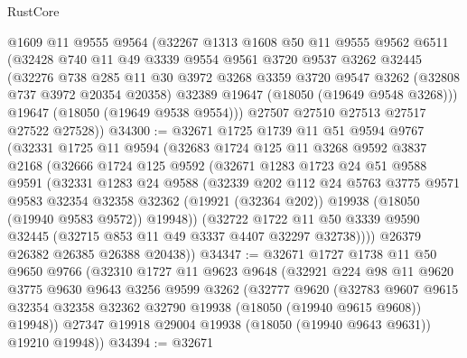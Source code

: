\begin{lexlean}{RustCore}
\begin{coremodule}
      @1609
      @11
      @9555
      @9564
      (@32267
        @1313
        @1608
        @50
        @11
        @9555
        @9562
        @6511
        (@32428
          @740
          @11
          @49
          @3339
          @9554
          @9561
          @3720
          @9537
          @3262
          @32445
          (@32276
            @738
            @285
            @11
            @30
            @3972
            @3268
            @3359
            @3720
            @9547
            @3262
            (@32808 @737 @3972 @20354 @20358)
            @32389
            @19647
            (@18050 (@19649 @9548 @3268)))
          @19647
          (@18050 (@19649 @9538 @9554)))
        @27507
        @27510
        @27513
        @27517
        @27522
        @27528))
@34300 := @32671
    @1725
    @1739
    @11
    @51
    @9594
    @9767
    (@32331
      @1725
      @11
      @9594
      (@32683
        @1724
        @125
        @11
        @3268
        @9592
        @3837
        @2168
        (@32666
          @1724
          @125
          @9592
          (@32671
            @1283
            @1723
            @24
            @51
            @9588
            @9591
            (@32331
              @1283
              @24
              @9588
              (@32339
                @202
                @112
                @24
                @5763
                @3775
                @9571
                @9583
                @32354
                @32358
                @32362
                (@19921 (@32364 @202))
                @19938
                (@18050 (@19940 @9583 @9572))
                @19948))
            (@32722
              @1722
              @11
              @50
              @3339
              @9590
              @32445
              (@32715 @853 @11 @49 @3337 @4407 @32297 @32738))))
        @26379
        @26382
        @26385
        @26388
        @20438))
@34347 := @32671
    @1727
    @1738
    @11
    @50
    @9650
    @9766
    (@32310
      @1727
      @11
      @9623
      @9648
      (@32921
        @224
        @98
        @11
        @9620
        @3775
        @9630
        @9643
        @3256
        @9599
        @3262
        (@32777
          @9620
          (@32783
            @9607
            @9615
            @32354
            @32358
            @32362
            @32790
            @19938
            (@18050 (@19940 @9615 @9608))
            @19948))
        @27347
        @19918
        @29004
        @19938
        (@18050 (@19940 @9643 @9631))
        @19210
        @19948))
@34394 := @32671

\end{coremodule}
\end{lexlean}
